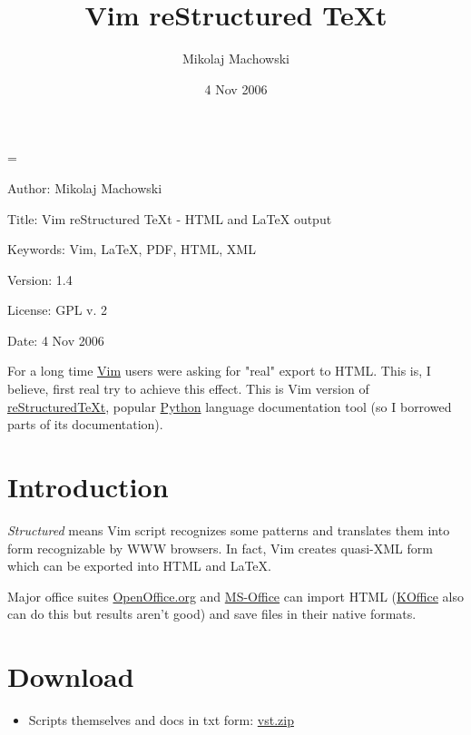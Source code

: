 \documentclass[12pt]{article}
\author{Mikolaj Machowski}
\date{4 Nov 2006}
\newenvironment{deflist}[1]{%
\begin{list}{}
{\renewcommand{\makelabel}[1]{\textbf{##1}\hfill}
\settowidth{\labelwidth}{\textbf{#1}}
\leftmargin=\labelwidth
\advance \leftmargin\labelsep}}
{\end{list}}
\begin{document}
\title{Vim reStructured \TeX{}t}
\maketitle
\begin{deflist}{Keywords:}

\item[Author:] Mikolaj Machowski

\item[Title:] Vim reStructured \TeX{}t - HTML and \LaTeX{} output

\item[Keywords:] Vim, \LaTeX{}, PDF, HTML, XML

\item[Version:] 1.4

\item[License:] GPL v. 2

\item[Date:] 4 Nov 2006
\end{deflist}

For a long time \href{http://www.vim.org}{Vim} users were asking for "real" export to HTML. This is,
I believe, first real try to achieve this effect. This is Vim version of
\href{http://docutils.sf.net}{reStructured\TeX{}t}, popular \href{http://www.python.org}{Python} language documentation tool (so I borrowed
parts of its documentation).

\tableofcontents
\hypertarget{lintroduction}{}
\section{Introduction}

\emph{Structured} means Vim script recognizes some patterns and translates them
into form recognizable by WWW browsers. In fact, Vim creates quasi-XML
form which can be exported into HTML and \LaTeX{}.

Major office suites \href{http://www.openoffice.org}{OpenOffice.org} and \href{http://www.microsoft.com}{MS-Office} can import HTML
(\href{http://koffice.kde.org}{KOffice} also can do this but results aren't good) and save files in
their native formats.

\hypertarget{ldownload}{}
\section{Download}
\begin{itemize}
\item
Scripts themselves and docs in txt form: \href{http://skawina.eu.org/mikolaj/vst.zip}{vst.zip}
\end{itemize}
\end{document}

